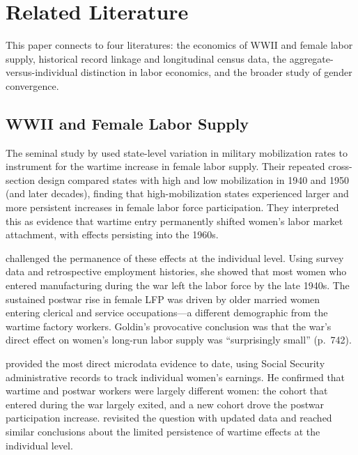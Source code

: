\documentclass[12pt]{article}
\begin{document}

\section{Related Literature}
\label{sec:literature}

This paper connects to four literatures: the economics of WWII and female labor supply, historical record linkage and longitudinal census data, the aggregate-versus-individual distinction in labor economics, and the broader study of gender convergence.

\subsection{WWII and Female Labor Supply}

The seminal study by \citet{acemoglu2004women} used state-level variation in military mobilization rates to instrument for the wartime increase in female labor supply. Their repeated cross-section design compared states with high and low mobilization in 1940 and 1950 (and later decades), finding that high-mobilization states experienced larger and more persistent increases in female labor force participation. They interpreted this as evidence that wartime entry permanently shifted women's labor market attachment, with effects persisting into the 1960s.

\citet{goldin1991role} challenged the permanence of these effects at the individual level. Using survey data and retrospective employment histories, she showed that most women who entered manufacturing during the war left the labor force by the late 1940s. The sustained postwar rise in female LFP was driven by older married women entering clerical and service occupations---a different demographic from the wartime factory workers. Goldin's provocative conclusion was that the war's direct effect on women's long-run labor supply was ``surprisingly small'' (p.\ 742).

\citet{rose2018rise} provided the most direct microdata evidence to date, using Social Security administrative records to track individual women's earnings. He confirmed that wartime and postwar workers were largely different women: the cohort that entered during the war largely exited, and a new cohort drove the postwar participation increase. \citet{goldin2013shocking} revisited the question with updated data and reached similar conclusions about the limited persistence of wartime effects at the individual level.
\end{document}
